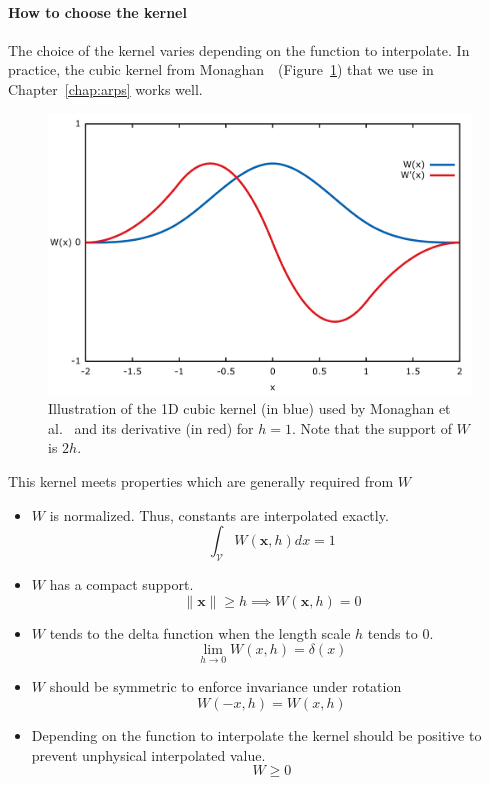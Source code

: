 \paragraph{How to choose the kernel}
The choice of the kernel varies depending on the function to interpolate. In practice, the cubic kernel from Monaghan~\cite{Monaghan1992}~(Figure~\ref{fig:cubicKernel}) that we use in Chapter~\ref{chap:arps} works well.
\begin{figure}[!h]
	\centering
	\includegraphics[width=\linewidth]{images/continuum_mechanics/cubicKernel.png}
	\caption[STAR mechanics: Cubic kernel]{\label{fig:cubicKernel}
    Illustration of the 1D cubic kernel (in blue) used by Monaghan et al.~\cite{Monaghan1992} and its derivative (in red) for $h=1$. Note that the support of $W$ is $2h$.}
\end{figure}
This kernel meets properties which are generally required from $W$
\begin{itemize}
\item $W$ is normalized. Thus, constants are interpolated exactly.
\begin{equation}
\int_{\mathcal{V}} W(\mathbf{x},h) dx = 1
\end{equation}
\item $W$ has a compact support.
\begin{equation}
\parallel \mathbf{x} \parallel \geq h \implies W(\mathbf{x},h) = 0 
\end{equation}
\item $W$ tends to the delta function when the length scale $h$ tends to $0$.
\begin{equation}
\lim_{h \rightarrow 0} W(x,h) = \delta(x)
\end{equation}
\item $W$ should be symmetric to enforce invariance under rotation
\begin{equation}
W(-x,h) = W(x,h)
\end{equation}
\item Depending on the function to interpolate the kernel should be positive to prevent unphysical interpolated value.
\begin{equation}
W \geq 0
\end{equation}
\end{itemize}
